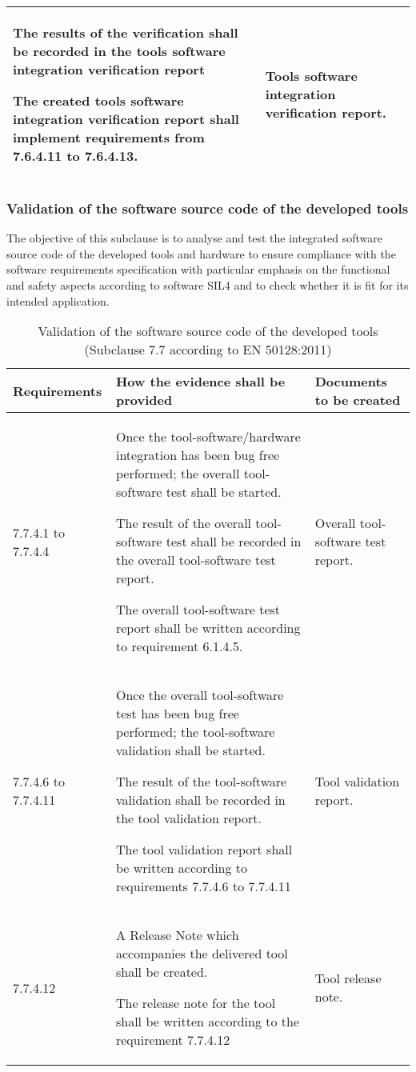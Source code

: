 \documentclass{template/openetcs_report}
\begin{document}
{\begin{longtable}{|p{2cm}|p{9cm}|p{3cm}|}
The results of the verification shall be recorded in the tools software integration verification report

The created tools software integration verification report shall implement requirements from 7.6.4.11 to 7.6.4.13.
& Tools software integration verification report.\\ 
\hline
\end{longtable}}



\subsubsection{Validation of the software source code of the developed tools}
\begin{flushleft}
 The objective of this subclause is to analyse and test the integrated software source code of the developed tools and hardware to ensure compliance with the software requirements specification with particular emphasis on the functional and safety aspects according to software SIL4 and to check whether it is fit for its
 intended application. \end{flushleft}
{\footnotesize\sffamily\centering
\begin{longtable}{|p{2cm}|p{9cm}|p{3cm}|}
\caption{Validation of the software source code of the developed tools (Subclause 7.7 according to EN 50128:2011)}\\
\hline
\bfseries Requirements & \bfseries How the evidence shall be provided & \bfseries Documents to be created\\
\hline
\hline
\endhead
\hline
\endfoot

7.7.4.1 to 7.7.4.4 & Once the tool-software/hardware integration has been bug free performed; the overall tool-software test shall be started.

The result of the overall tool-software test shall be recorded in the overall tool-software test report.

The overall tool-software test report shall be written according to requirement 6.1.4.5.

& Overall tool-software test report.\\ 
\hline
7.7.4.6 to 7.7.4.11 & Once the overall tool-software test has been bug free performed; the tool-software validation shall be started.

The result of the tool-software validation shall be recorded in the tool validation report.

The tool validation report shall be written according to requirements 7.7.4.6 to 7.7.4.11
& Tool validation report.\\ 
\hline
7.7.4.12 & A Release Note which accompanies the delivered tool shall be created.

The release note for the tool shall be written according to the requirement 7.7.4.12
& Tool release note.\\ 
\hline
\end{longtable}}
\end{document}
